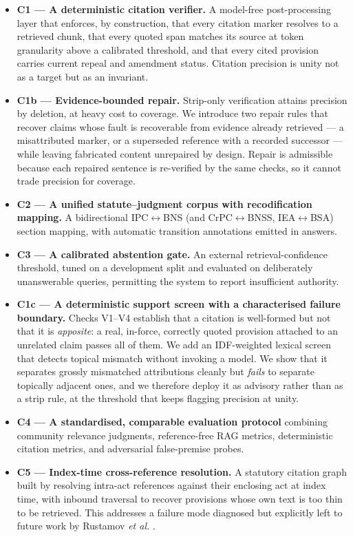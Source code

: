 \documentclass[conference]{IEEEtran}
\begin{document}
\begin{itemize}
\item \textbf{C1 — A deterministic citation verifier.} A model-free post-processing layer that enforces, by construction, that every citation marker resolves to a retrieved chunk, that every quoted span matches its source at token granularity above a calibrated threshold, and that every cited provision carries current repeal and amendment status. Citation precision is unity not as a target but as an invariant.
\item \textbf{C1b — Evidence-bounded repair.} Strip-only verification attains precision by deletion, at heavy cost to coverage. We introduce two repair rules that recover claims whose fault is recoverable from evidence already retrieved --- a misattributed marker, or a superseded reference with a recorded successor --- while leaving fabricated content unrepaired by design. Repair is admissible because each repaired sentence is re-verified by the same checks, so it cannot trade precision for coverage.
\item \textbf{C2 — A unified statute--judgment corpus with recodification mapping.} A bidirectional IPC$\leftrightarrow$BNS (and CrPC$\leftrightarrow$BNSS, IEA$\leftrightarrow$BSA) section mapping, with automatic transition annotations emitted in answers.
\item \textbf{C3 — A calibrated abstention gate.} An external retrieval-confidence threshold, tuned on a development split and evaluated on deliberately unanswerable queries, permitting the system to report insufficient authority.
\item \textbf{C1c — A deterministic support screen with a characterised failure boundary.} Checks V1--V4 establish that a citation is well-formed but not that it is \emph{apposite}: a real, in-force, correctly quoted provision attached to an unrelated claim passes all of them. We add an IDF-weighted lexical screen that detects topical mismatch without invoking a model. We show that it separates grossly mismatched attributions cleanly but \emph{fails} to separate topically adjacent ones, and we therefore deploy it as advisory rather than as a strip rule, at the threshold that keeps flagging precision at unity.
\item \textbf{C4 — A standardised, comparable evaluation protocol} combining community relevance judgments, reference-free RAG metrics, deterministic citation metrics, and adversarial false-premise probes.
\item \textbf{C5 — Index-time cross-reference resolution.} A statutory citation graph built by resolving intra-act references against their enclosing act at index time, with inbound traversal to recover provisions whose own text is too thin to be retrieved. This addresses a failure mode diagnosed but explicitly left to future work by Rustamov \textit{et al.} \cite{rustamov2025}.
\end{itemize}
\end{document}
